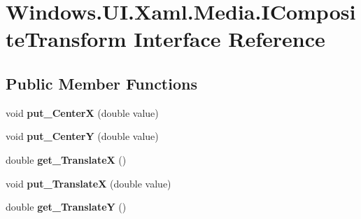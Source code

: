 \hypertarget{interface_windows_1_1_u_i_1_1_xaml_1_1_media_1_1_i_composite_transform}{}\section{Windows.\+U\+I.\+Xaml.\+Media.\+I\+Composite\+Transform Interface Reference}
\label{interface_windows_1_1_u_i_1_1_xaml_1_1_media_1_1_i_composite_transform}
\subsection*{Public Member Functions}
\begin{DoxyCompactItemize}
\item 
\mbox{\label{interface_windows_1_1_u_i_1_1_xaml_1_1_media_1_1_i_composite_transform_a7d6d85f88b20215ed3ea38303a205255}} 
void {\bfseries put\+\_\+\+CenterX} (double value)
\item 
\mbox{\label{interface_windows_1_1_u_i_1_1_xaml_1_1_media_1_1_i_composite_transform_ac24af59d7b97c179e5bf45344b26e960}} 
void {\bfseries put\+\_\+\+CenterY} (double value)
\item 
\mbox{\label{interface_windows_1_1_u_i_1_1_xaml_1_1_media_1_1_i_composite_transform_a1f9c47e34c9e72063f04ffdec31b862a}} 
double {\bfseries get\+\_\+\+TranslateX} ()
\item 
\mbox{\label{interface_windows_1_1_u_i_1_1_xaml_1_1_media_1_1_i_composite_transform_ac99780ca6fd6f99772988eb2955d55eb}} 
void {\bfseries put\+\_\+\+TranslateX} (double value)
\item 
\mbox{\label{interface_windows_1_1_u_i_1_1_xaml_1_1_media_1_1_i_composite_transform_ab69da6f2ebd1b82e0297f6247079a32b}} 
double {\bfseries get\+\_\+\+TranslateY} ()
\item 
\mbox{\label{interface_windows_1_1_u_i_1_1_xaml_1_1_media_1_1_i_composite_transform_a4eef58c622c9fdad76754e50e5da2b53}} 

\end{DoxyCompactItemize}
